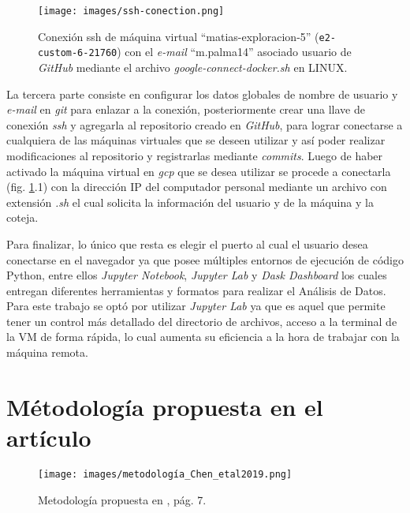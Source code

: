 \begin{figure}[H]\label{sshconec}
    \centering
          \texttt{[image: images/ssh-conection.png]}
    \caption[Conexión ssh de máquina virtual]{\footnotesize Conexión ssh de máquina virtual ``matias-exploracion-5'' (\texttt{e2-custom-6-21760}) con el \textit{e-mail} ``m.palma14'' asociado usuario de \textit{GitHub} mediante el archivo \textit{google-connect-docker.sh} en LINUX.}
\end{figure}

La tercera parte consiste en configurar los datos globales de nombre de usuario y \textit{e-mail} en \textit{git} para
enlazar a la conexión, posteriormente crear una llave de conexión \textit{ssh} y agregarla al repositorio creado en \textit{GitHub}, para lograr conectarse a cualquiera de las máquinas virtuales que se deseen utilizar y así poder realizar modificaciones 
al repositorio y registrarlas mediante \textit{commits}.
Luego de haber activado la máquina virtual en \textit{gcp} que se desea utilizar se procede a conectarla (fig. \ref{sshconec}.1) con la dirección IP del computador personal 
mediante un archivo con extensión \textit{.sh} el cual solicita la información del usuario y de la máquina y la coteja.

Para finalizar, lo único que resta es elegir el puerto al cual el usuario desea conectarse en el navegador ya que posee múltiples entornos de ejecución de código Python, entre ellos \textit{Jupyter Notebook}, \textit{Jupyter Lab} y \textit{Dask Dashboard}
los cuales entregan diferentes herramientas y formatos para realizar el Análisis de Datos. Para este trabajo se optó por utilizar \textit{Jupyter Lab} ya que es aquel que permite tener un control más detallado del directorio de archivos, acceso a la terminal
de la VM de forma rápida, lo cual aumenta su eficiencia a la hora de trabajar con la máquina remota. 


%
%
%
%
\section{Métodología propuesta en el artículo}

\begin{figure}[H]
    \centering
          \texttt{[image: images/metodología\_Chen\_etal2019.png]}
          \vskip -0.1in
    \caption[Metodología de reducción de dimensión propuesta]{\footnotesize Metodología propuesta en \cite{11}, pág. 7.}
    \label{metodologia}
\end{figure}

